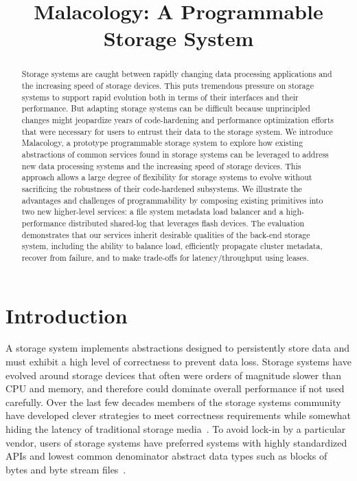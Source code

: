 \documentclass[preprint]{sigplanconf-eurosys}
\title{Malacology: A Programmable Storage System}
\date{}
\begin{document}
\maketitle

\begin{abstract}
Storage systems are caught between rapidly changing data
processing applications and the increasing speed of storage devices. This puts
tremendous pressure on storage systems to support rapid evolution both in terms of their
interfaces and their performance. But adapting storage systems can be difficult
because unprincipled changes might jeopardize years of code-hardening and
performance optimization efforts that were necessary for users to entrust their
data to the storage system.  We introduce  Malacology, a prototype programmable
storage system to explore how existing abstractions of common services found in
storage systems can be leveraged to address new data processing systems and the
increasing speed of storage devices. This approach allows a large degree of
flexibility for storage systems to evolve without sacrificing the robustness of
their code-hardened subsystems.  We illustrate the advantages and challenges of
programmability by composing existing primitives into two new higher-level
services: a file system metadata load balancer and a high-performance distributed
shared-log that leverages flash devices. The evaluation demonstrates that our
services inherit desirable qualities of the back-end storage system, including
the ability to balance load, efficiently propagate cluster metadata, recover
from failure, and to make trade-offs for latency/throughput using leases.
\end{abstract}

\section{Introduction}
\label{introduction}
\label{sec:intro}

A storage system implements abstractions designed to persistently store data
and must exhibit a high level of correctness to prevent data loss.  Storage
systems have evolved around storage devices that often were orders of magnitude
slower than CPU and memory, and therefore could dominate overall performance if
not used carefully. Over the last few decades members of the storage systems
community have developed clever strategies to meet correctness requirements
while somewhat hiding the latency of traditional storage
media~\cite{brewer_disks_2016}. To avoid lock-in by a particular vendor, users
of storage systems have preferred systems with highly standardized APIs and
lowest common denominator abstract data types such as blocks of bytes and byte
stream files~\cite{armbrust_view_2010}.
\end{document}
